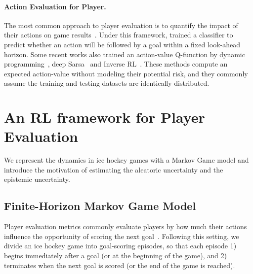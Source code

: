 \documentclass{article}
\newcommand{\dataset}{\mathcal{D}}
\begin{document}
\paragraph{Action Evaluation for Player.} 
The most common approach to player evaluation is to quantify the impact of their actions on game results~\cite{schwartz2017handbook}. Under this framework, \cite{Decroos2019Actions} trained a classifier to predict whether an action will be followed by a goal within a fixed look-ahead horizon.  
Some recent works also trained an action-value Q-function by dynamic programming~\cite{Routley2015Markov}, deep Sarsa~\cite{Liu2018DRL,Liu2020soccer} and Inverse RL~\cite{Luo2020IRL}. These methods compute an expected action-value without modeling their potential risk, and they commonly assume the training and testing datasets are identically distributed. 


\section{An RL framework for Player Evaluation}
We represent the dynamics in ice hockey games with a Markov Game model and  introduce the motivation of estimating the aleatoric uncertainty and the epistemic uncertainty.

\subsection{Finite-Horizon Markov Game Model}
Player evaluation metrics commonly evaluate players by how much their actions influence the opportunity of scoring the next goal~\cite{Liu2018DRL,Decroos2019Actions,Sun2020Cracking}. Following this setting,  we divide an ice hockey game into goal-scoring episodes, so that each episode 1) begins immediately after a goal (or at the beginning of the game), and 2) terminates when the next goal is scored (or the end of the game is reached).
\end{document}
